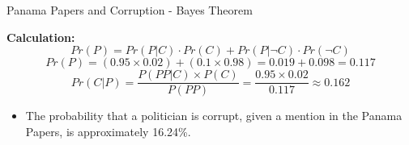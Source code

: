 \documentclass[handout]{beamer} %
\begin{document}
\begin{frame}{Panama Papers and Corruption - Bayes Theorem}

    \textbf{Calculation:}
    \[
    Pr(P) = Pr(P|C) \cdot Pr(C) + Pr(P|\neg C) \cdot Pr(\neg C)
    \]\pause
    \[
    Pr(P) = (0.95 \times 0.02) + (0.1 \times 0.98) = 0.019 + 0.098 = 0.117
    \]\pause
    \[
    Pr(C|P) = \frac{P(PP|C) \times P(C)}{P(PP)} = \frac{0.95 \times 0.02}{0.117} \approx 0.162
    \]\pause
    \begin{itemize}
        \item The probability that a politician is corrupt, given a mention in the Panama Papers, is approximately 16.24\%.
    \end{itemize}
\end{frame}
\end{document}
